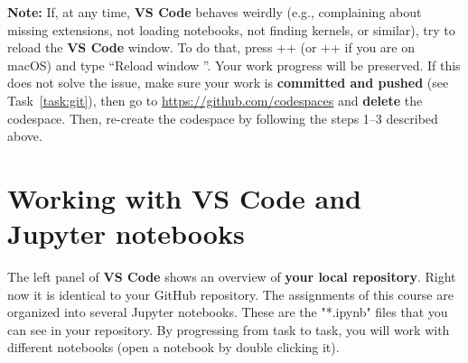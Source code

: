\documentclass[12pt,a4paper]{article}
\begin{document}
\vspace{-1em}
\begin{figure}[h!]
    \captionsetup[subfigure]{labelformat=empty}
    \centering
    \hfill
    \hfill
    \hfill
\end{figure}

\textbf{Note:} If, at any time, \textbf{VS Code} behaves weirdly (e.g., complaining about missing extensions, not loading notebooks, not finding kernels, or similar), try to reload the \textbf{VS Code} window. To do that, press \Ctrl+\keystroke{\shift}+ (or \keystroke{\cmd}+\keystroke{\shift}+ if you are on macOS) and type ``Reload window \Return''. Your work progress will be preserved. If this does not solve the issue, make sure your work is \textbf{committed and pushed} (see Task~\ref{task:git}), then go to \url{https://github.com/codespaces} and \textbf{delete} the codespace. Then, re-create the codespace by following the steps 1--3 described above.

\section{Working with VS Code and Jupyter notebooks}
\label{task:jupyter}

The left panel of \textbf{VS Code} shows an overview of \textbf{your local repository}. Right now it is identical to your GitHub repository. The assignments of this course are organized into several Jupyter notebooks. These are the "*.ipynb" files that you can see in your repository. By progressing from task to task, you will work with different notebooks (open a notebook by double clicking it).
\end{document}
